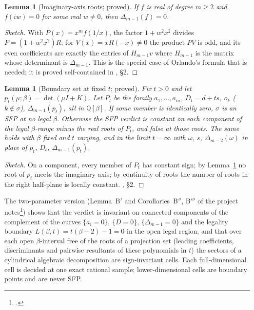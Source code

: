 \documentclass[11pt]{article}
\newtheorem{lemma}[theorem]{Lemma}
\theoremstyle{definition}
\newcommand{\Q}{\mathbb{Q}}
\begin{document}
\begin{lemma}[Imaginary-axis roots; proved]\label{lem:b3}
If $f$ is real of degree $m\ge2$ and $f(iw)=0$ for some real $w\neq0$, then $\Delta_{m-1}(f)=0$.
\end{lemma}
\begin{proof}[Sketch]
With $P(x)=x^mf(1/x)$, the factor $1+w^2x^2$ divides $P=(1+w^2x^2)R$; for $V(x)=xR(-x)\neq0$ the product $PV$ is odd,
and its even coefficients are exactly the entries of $H_{m-1}v$ where $H_{m-1}$ is the matrix whose determinant is
$\Delta_{m-1}$. This is the special case of Orlando's formula that is needed; it is proved self-contained in
, \S2.
\end{proof}

\begin{lemma}[Boundary set at fixed $t$; proved]\label{lem:B}
Fix $t>0$ and let $p_t(\mu;\beta)=\det(\mu I+K)$. Let $P_t$ be the family
$a_1,\dots,a_m$, $D_t=d+ts$, $o_k$ ($k\notin\sigma$), $\Delta_{m-1}(p_t)$, all in $\Q[\beta]$. If some member is
identically zero, $\sigma$ is an SFP at no legal $\beta$. Otherwise the SFP verdict is constant on each component of the
legal $\beta$-range minus the real roots of $P_t$, and false at those roots. The same holds with $\beta$ fixed and $t$
varying, and in the limit $t=\infty$ with $\omega$, $s$, $\Delta_{m-2}(\omega)$ in place of $p_t$, $D_t$,
$\Delta_{m-1}(p_t)$.
\end{lemma}
\begin{proof}[Sketch]
On a component, every member of $P_t$ has constant sign; by Lemma~\ref{lem:b3} no root of $p_t$ meets the imaginary
axis; by continuity of roots the number of roots in the right half-plane is locally constant. , \S2.
\end{proof}

The two-parameter version (Lemma~B$'$ and Corollaries~B$''$, B$'''$ of the project
notes\footnote{.}) shows that the verdict is invariant on connected components of
the complement of the curves $\{a_i=0\}$, $\{D=0\}$, $\{\Delta_{m-1}=0\}$ and the legality boundary
$L(\beta,t)=t(\beta-2)-1=0$ in the open legal region, and that over each open $\beta$-interval free of the roots of a
projection set (leading coefficients, discriminants and pairwise resultants of these polynomials in $t$) the sectors
of a cylindrical algebraic decomposition are sign-invariant cells. Each full-dimensional cell is decided at one exact
rational sample; lower-dimensional cells are boundary points and are never SFP.
\end{document}

